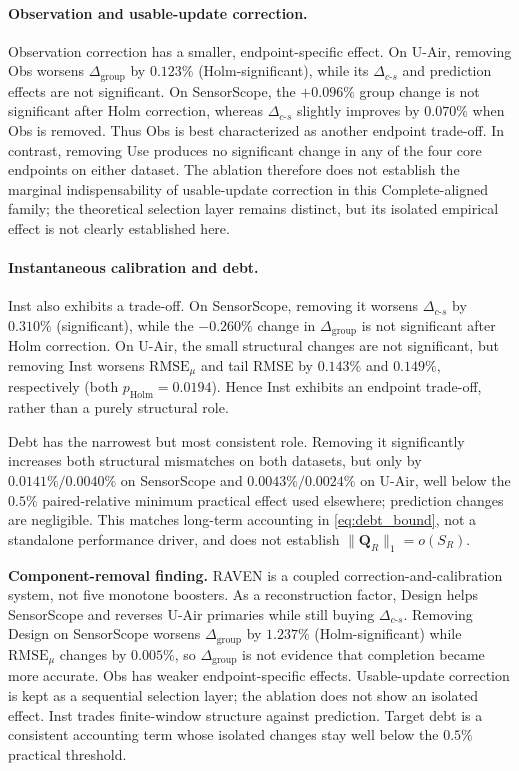 \documentclass[letterpaper,journal]{IEEEtran}
\begin{document}
\paragraph{Observation and usable-update correction.}
Observation correction has a smaller, endpoint-specific effect.  On U-Air,
removing Obs worsens $\Delta_{\mathrm{group}}$ by $0.123\%$
(Holm-significant), while its $\Delta_{c\text{-}s}$ and prediction effects are
not significant.  On SensorScope, the $+0.096\%$ group change is not
significant after Holm correction, whereas
$\Delta_{c\text{-}s}$ slightly improves by $0.070\%$ when Obs is removed.
Thus Obs is best characterized as another endpoint trade-off.  In contrast,
removing Use produces no significant change in any of the four core endpoints
on either dataset.  The ablation therefore does not establish the marginal
indispensability of usable-update correction in this Complete-aligned family;
the theoretical selection layer remains distinct, but its isolated empirical
effect is not clearly established here.

\paragraph{Instantaneous calibration and debt.}
Inst also exhibits a trade-off.  On SensorScope, removing it worsens
$\Delta_{c\text{-}s}$ by $0.310\%$ (significant), while the
$-0.260\%$ change in $\Delta_{\mathrm{group}}$ is not significant after Holm
correction.  On U-Air, the small structural
changes are not significant, but removing Inst worsens
$\mathrm{RMSE}_{\mu}$ and tail RMSE by $0.143\%$ and $0.149\%$,
respectively (both $p_{\mathrm{Holm}}=0.0194$).  Hence Inst exhibits an
endpoint trade-off, rather than a purely structural role.

Debt has the narrowest but most consistent role.  Removing it significantly
increases both structural mismatches on both datasets, but only by
$0.0141\%/0.0040\%$ on SensorScope and
$0.0043\%/0.0024\%$ on U-Air, well below the $0.5\%$ paired-relative
minimum practical effect used elsewhere; prediction changes are negligible.
This matches long-term accounting in \eqref{eq:debt_bound}, not a
standalone performance driver, and does not establish
$\|\mathbf Q_R\|_1=o(S_R)$.

\noindent\textbf{Component-removal finding.}
RAVEN is a coupled correction-and-calibration system, not five monotone
boosters.  As a reconstruction factor, Design helps SensorScope and
reverses U-Air primaries while still buying $\Delta_{c\text{-}s}$.
Removing Design on SensorScope worsens $\Delta_{\mathrm{group}}$ by
$1.237\%$ (Holm-significant) while $\mathrm{RMSE}_{\mu}$ changes by
$0.005\%$, so $\Delta_{\mathrm{group}}$ is not evidence that completion
became more accurate.
Obs has weaker endpoint-specific effects.  Usable-update correction is
kept as a sequential selection layer; the ablation does not show an isolated
effect.  Inst trades finite-window structure against prediction.
Target debt is a consistent accounting term whose isolated changes stay
well below the $0.5\%$ practical threshold.
\end{document}
